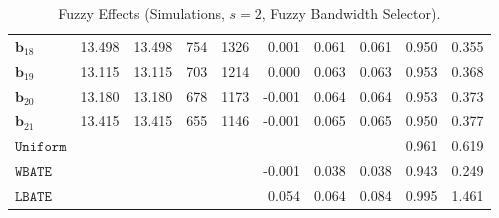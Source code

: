 \documentclass[10pt]{article}
\newcommand{\bb}{\mathbf{b}}
\begin{document}
\begin{table}[p]
\begin{tabular}{lccccrrrrr}
$\bb_{18}$ & 13.498 & 13.498 & 754 & 1326 & 0.001 & 0.061 & 0.061 & 0.950 & 0.355 \\
$\bb_{19}$ & 13.115 & 13.115 & 703 & 1214 & 0.000 & 0.063 & 0.063 & 0.953 & 0.368 \\
$\bb_{20}$ & 13.180 & 13.180 & 678 & 1173 & -0.001 & 0.064 & 0.064 & 0.953 & 0.373 \\
$\bb_{21}$ & 13.415 & 13.415 & 655 & 1146 & -0.001 & 0.065 & 0.065 & 0.950 & 0.377 \\
\midrule
$\mathtt{Uniform}$ &  &  &  &  &  &  &  & 0.961 & 0.619 \\
\midrule
$\mathtt{WBATE}$ &  &  &  &  & -0.001 & 0.038 & 0.038 & 0.943 & 0.249 \\
\midrule
$\mathtt{LBATE}$ &  &  &  &  & 0.054 & 0.064 & 0.084 & 0.995 & 1.461 \\
\bottomrule\bottomrule
\end{tabular}

    \caption{Fuzzy Effects (Simulations, $s=2$, Fuzzy Bandwidth Selector).}
    \label{tab:sa-simuls-fuzzy-s2-bwmain}
\end{table}
\end{document}
